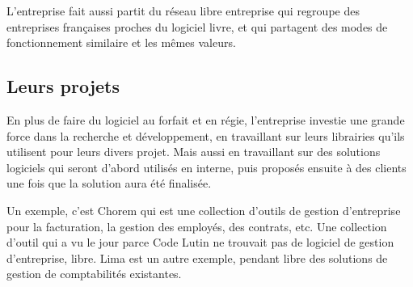 L'entreprise fait aussi partit du réseau libre entreprise qui regroupe des
entreprises françaises proches du logiciel livre, et qui partagent des modes de
fonctionnement similaire et les mêmes valeurs.


\subsection{Leurs projets}

En plus de faire du logiciel au forfait et en régie, l'entreprise investie une
grande force dans la recherche et développement, en travaillant sur leurs librairies
qu'ils utilisent pour leurs divers projet. Mais aussi en travaillant sur des
solutions logiciels qui seront d'abord utilisés en interne, puis proposés
ensuite à des clients une fois que la solution aura été finalisée.

Un exemple, c'est Chorem qui est une collection d'outils de gestion d'entreprise
pour la facturation, la gestion des employés, des contrats, etc. Une collection
d'outil qui a vu le jour parce Code Lutin ne trouvait pas de logiciel de gestion
d'entreprise, libre. Lima est un autre exemple, pendant libre des solutions de
gestion de comptabilités existantes.
